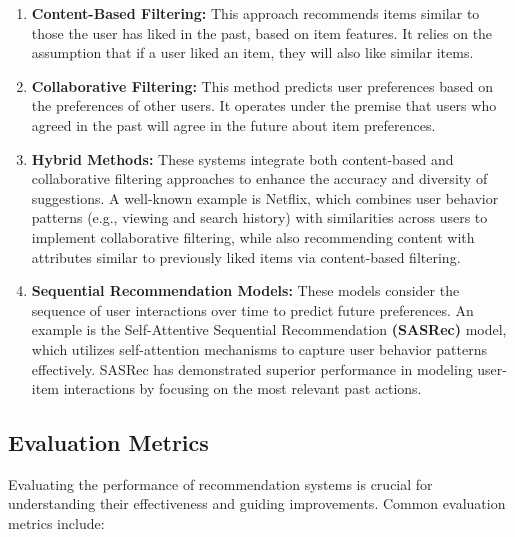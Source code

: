 \begin{enumerate}
	\item \textbf{Content-Based Filtering:} This approach recommends items similar to those the user has liked in the past, based on item features. It relies on the assumption that if a user liked an item, they will also like similar items.
	
	\item \textbf{Collaborative Filtering:} This method predicts user preferences based on the preferences of other users. It operates under the premise that users who agreed in the past will agree in the future about item preferences.
	
	\item \textbf{Hybrid Methods:} These systems  integrate both content-based and collaborative filtering approaches to enhance the accuracy and diversity of suggestions. A well-known example is Netflix, which combines user behavior patterns (e.g., viewing and search history) with similarities across users to implement collaborative filtering, while also recommending content with attributes similar to previously liked items via content-based filtering.
	
	\item \textbf{Sequential Recommendation Models:} These models consider the sequence of user interactions over time to predict future preferences. An example is the Self-Attentive Sequential Recommendation \textbf{(SASRec)} model, which utilizes self-attention mechanisms to capture user behavior patterns effectively. SASRec has demonstrated superior performance in modeling user-item interactions by focusing on the most relevant past actions.
\end{enumerate}

\subsection{Evaluation Metrics}

Evaluating the performance of recommendation systems is crucial for understanding their effectiveness and guiding improvements. Common evaluation metrics include:

